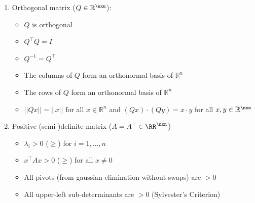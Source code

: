 \begin{enumerate}
\begin{itemize}
            \item The eigenvectors of $A$ form a basis for $\mathbb{R}^n$
            \item For every eigenvalue $\lambda$: Geom. mult. = Alg. mult
            \item The sum of all Geom. mult. is $n$
        \end{itemize}
        \textit{Note}: $n$ distinct eivenvalues $\implies$ diagonalizable \\
        \textit{Note}: $A$ symmetric $\implies$ orthogonally diagonalizeable
    \item Orthogonal matrix ($Q \in \mathbb{R}^{\nxn}$):
        \begin{itemize}
            \item $Q$ is orthogonal
            \item $Q^\top Q = I$
            \item $Q^{-1} = Q^\top$
            \item The columns of $Q$ form an orthonormal basis of $\mathbb{R}^n$
            \item The rows of $Q$ form an orthonormal basis of $\mathbb{R}^n$
            \item $||Qx|| = ||x||$ for all $x \in \mathbb{R}^n$ and $(Qx) \cdot
                  (Qy) = x \cdot y$ for all $x, y \in \mathbb{R}^{\nxn}$
        \end{itemize}
    \item Positive (semi-)definite matrix ($A = A^\top \in \RR^{\nxn}$)
        \begin{itemize}
            \item $\lambda_i > 0$ ($\geq$) for $i = 1, \dots, n$
            \item $x^\top Ax > 0$ ($\geq$) for all $x\ne 0$
            \item All pivots (from gaussian elimination without swaps) are $> 0$
            \item All upper-left sub-determinants are $> 0$ (Sylvester's Criterion)
        \end{itemize}
\end{enumerate}

